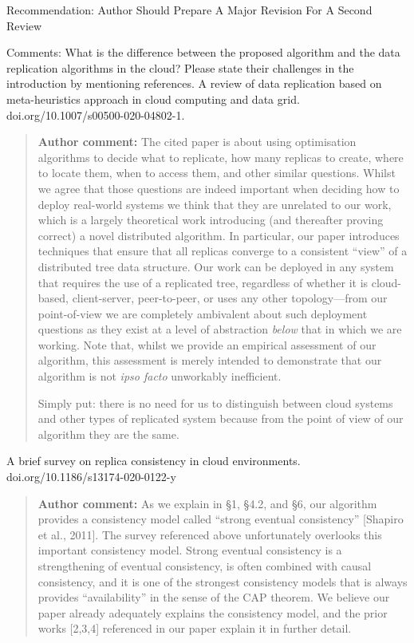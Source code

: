 \documentclass[10pt]{article}
\newcommand{\authorcomment}[1]{\begin{quote}\textbf{Author comment:} #1\end{quote}}
\begin{document}
\begin{spverbatim}
Recommendation: Author Should Prepare A Major Revision For A Second Review

Comments:
What is the difference between the proposed algorithm and the data replication algorithms in the cloud? Please state their challenges in the introduction by mentioning references.
A review of data replication based on meta-heuristics approach in cloud computing and data grid. doi.org/10.1007/s00500-020-04802-1.
\end{spverbatim}
\authorcomment{The cited paper is about using optimisation algorithms to decide what to replicate, how many replicas to create, where to locate them, when to access them, and other similar questions.
Whilst we agree that those questions are indeed important when deciding how to deploy real-world systems we think that they are unrelated to our work, which is a largely theoretical work introducing (and thereafter proving correct) a novel distributed algorithm.
In particular, our paper introduces techniques that ensure that all replicas converge to a consistent ``view'' of a distributed tree data structure.
Our work can be deployed in any system that requires the use of a replicated tree, regardless of whether it is cloud-based, client-server, peer-to-peer, or uses any other topology---from our point-of-view we are completely ambivalent about such deployment questions as they exist at a level of abstraction \emph{below} that in which we are working.
Note that, whilst we provide an empirical assessment of our algorithm, this assessment is merely intended to demonstrate that our algorithm is not \emph{ipso facto} unworkably inefficient.

Simply put: there is no need for us to distinguish between cloud systems and other types of replicated system because from the point of view of our algorithm they are the same.}
\begin{spverbatim}
A brief survey on replica consistency in cloud environments. doi.org/10.1186/s13174-020-0122-y
\end{spverbatim}
\authorcomment{As we explain in {\S}1, {\S}4.2, and {\S}6, our algorithm provides a consistency model called ``strong eventual consistency'' [Shapiro et al., 2011].
The survey referenced above unfortunately overlooks this important consistency model.
Strong eventual consistency is a strengthening of eventual consistency, is often combined with causal consistency, and it is one of the strongest consistency models that is always provides ``availability'' in the sense of the CAP theorem.
We believe our paper already adequately explains the consistency model, and the prior works [2,3,4] referenced in our paper explain it in further detail.}
\end{document}
